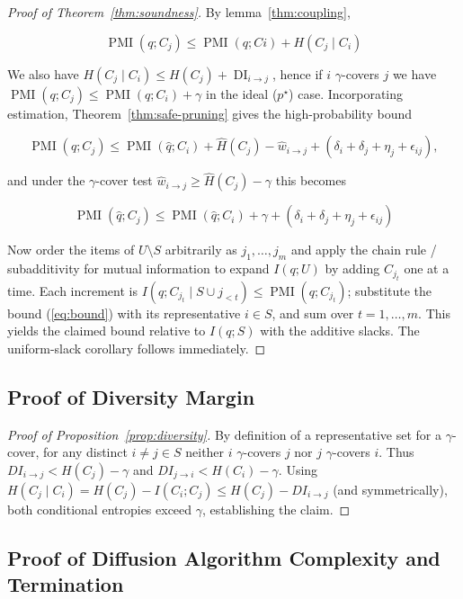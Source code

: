 \documentclass{article} %
\theoremstyle{definition}
\DeclareMathOperator{\DI}{DI}
\DeclareMathOperator{\PMI}{PMI}
\begin{document}
\begin{proof}[Proof of Theorem~\ref{thm:soundness}]
By lemma~\ref{thm:coupling}, 

$$\PMI(q;C_j) \le \PMI(q; Ci) + H(C_j\mid C_i)$$

We also have $H(C_j \mid C_i) \le H(C_j) + \DI_{i\to j}$, hence if $i$ $\gamma$-covers $j$ we have $\PMI(q;C_j) \le \PMI(q;C_i) + \gamma$ in the ideal ($p^\star$) case. Incorporating estimation, Theorem~\ref{thm:safe-pruning} gives the high-probability bound

$$\PMI(\hat{q}; C_j) \le \PMI(\hat{q};C_i) + \hat{H}(C_j) -\hat{w}_{i\to j} + (\delta_i + \delta_j + \eta_j + \epsilon_{ij}),$$

and under the $\gamma$-cover test $\hat{w}_{i\to j} \ge \hat{H}(C_j) -\gamma$ this becomes

\begin{equation}\label{eq:bound}
\PMI(\hat{q}; C_j) \le \PMI(\hat{q};C_i) + \gamma + (\delta_i + \delta_j + \eta_j + \epsilon_{ij})    
\end{equation}

Now order the items of $U\setminus S$ arbitrarily as $j_1,\dots,j_m$ and apply the chain rule / subadditivity for mutual information to expand $I(q;U)$ by adding $C_{j_t}$ one at a time. Each increment is $I(q;C_{j_t}\mid S\cup{j_{<t}})\le \PMI(q;C_{j_t})$; substitute the bound (\ref{eq:bound}) with its representative $i\in S$, and sum over $t=1,\dots,m$. This yields the claimed bound relative to $I(q;S)$ with the additive slacks. The uniform-slack corollary follows immediately.
\end{proof}

\subsection{Proof of Diversity Margin}\label{sec:proof-diversity}

\begin{proof}[Proof of Proposition~\ref{prop:diversity}]
By definition of a representative set for a $\gamma$-cover, for any distinct $i\ne j\in S$ neither $i$ $\gamma$-covers $j$ nor $j$ $\gamma$-covers $i$. Thus $DI_{i\to j}<H(C_j)-\gamma$ and $DI_{j\to i}<H(C_i)-\gamma$. Using $H(C_j\mid C_i)=H(C_j)-I(C_i;C_j)\le H(C_j)-DI_{i\to j}$ (and symmetrically), both conditional entropies exceed $\gamma$, establishing the claim.
\end{proof}

\subsection{Proof of Diffusion Algorithm Complexity and Termination}\label{sec:proof-algorithm}
\end{document}
